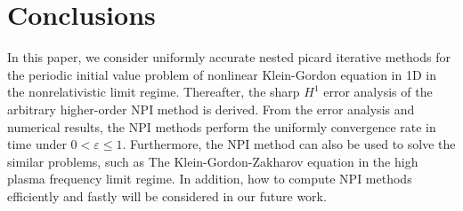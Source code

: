 \documentclass[final,leqno,showlabe]{siamltex}
\begin{document}
\section{Conclusions}
\label{sec:conclusions}
In this paper, we consider uniformly accurate nested picard iterative methods for the periodic initial value problem of nonlinear Klein-Gordon equation in 1D in the nonrelativistic limit regime. Thereafter, the sharp $H^1$ error analysis of the arbitrary higher-order NPI method is derived. From the error analysis and numerical results, the NPI methods perform the uniformly convergence rate in time under $0<\varepsilon\leq 1$. Furthermore, the NPI method can also be used to solve the similar problems, such as The Klein-Gordon-Zakharov equation in the high plasma frequency limit regime. In addition, how to compute NPI methods efficiently and fastly will be considered in our future work.

\appendix
\end{document}
